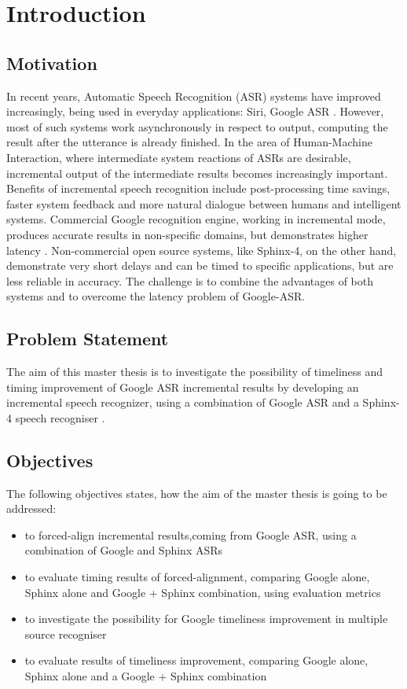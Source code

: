 \chapter{Introduction}
\label{chap:introduction}
\section {Motivation}
In recent years, Automatic Speech Recognition (ASR) systems have improved
increasingly, being used in everyday applications: Siri, Google ASR 
\parencite {mcgrawgrauenstein2012}. However, most of such systems work
asynchronously in respect to output, computing the result after the utterance is already finished.
In the area of Human-Machine Interaction, 
where intermediate system reactions of ASRs are 
desirable,  incremental output of the intermediate results becomes increasingly
important. Benefits of  incremental speech recognition include post-processing
time savings, faster system feedback and more natural dialogue between humans
and intelligent systems. Commercial Google recognition
engine, working in incremental mode, produces accurate
results in non-specific domains, but demonstrates higher latency
\parencite{mcgrawgrauenstein2012}.  Non-commercial open source systems, like Sphinx-4, on the other hand, demonstrate very short delays and can be timed to specific
applications, but are less reliable in accuracy.
The challenge is to combine the advantages of both systems and  to overcome the latency problem of Google-ASR.
\section {Problem Statement}
The aim of this master thesis is to investigate the possibility of
timeliness and timing improvement of Google ASR
incremental results by developing an incremental speech recognizer, using a
combination of Google ASR \parencite
{mcgrawgrauenstein2012} and a Sphinx-4 speech recogniser
\parencite {baumannetal2009:naacl}. 
\section {Objectives}

The following objectives states, how the aim of the master thesis is going to be
addressed:
 \begin  {itemize}
   \item to forced-align incremental results,coming from Google ASR, using a
   combination of Google and Sphinx ASRs
   \item to evaluate timing results of forced-alignment, comparing Google
   alone, Sphinx alone and Google + Sphinx combination, using evaluation metrics
   \item to investigate the possibility for Google timeliness improvement in multiple source recogniser
   \item to evaluate results of timeliness improvement, comparing Google alone,
   Sphinx alone and a Google + Sphinx combination
 \end {itemize}


